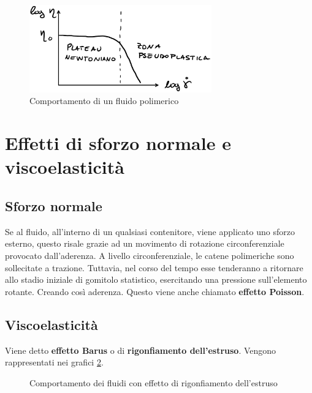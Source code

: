 \begin{figure}
\centering
\includegraphics[width = 0.7\textwidth]{gfx/PseudoPlastico}
\caption{Comportamento di un fluido polimerico}
\label{fig:PesudoPlastico}
\end{figure}

\section{Effetti di sforzo normale e viscoelasticità}
\subsection{Sforzo normale}
Se al fluido, all'interno di un qualsiasi contenitore, viene applicato uno sforzo esterno, questo risale grazie ad un movimento di rotazione circonferenziale provocato dall'aderenza.
A livello circonferenziale, le catene polimeriche sono sollecitate a trazione. Tuttavia, nel corso del tempo esse tenderanno a ritornare allo stadio iniziale di gomitolo statistico, esercitando una pressione sull'elemento rotante. Creando così aderenza.
Questo viene anche chiamato \textbf{effetto Poisson}.

\subsection{Viscoelasticità}
Viene detto \textbf{effetto Barus} o di \textbf{rigonfiamento dell'estruso}.
Vengono rappresentati nei grafici \ref{fig:RigonfiamentoEstruso}.

\begin{figure}
\centering
{}\quad
{}
\caption{Comportamento dei fluidi con effetto di rigonfiamento dell'estruso}
\label{fig:RigonfiamentoEstruso}
\end{figure}

